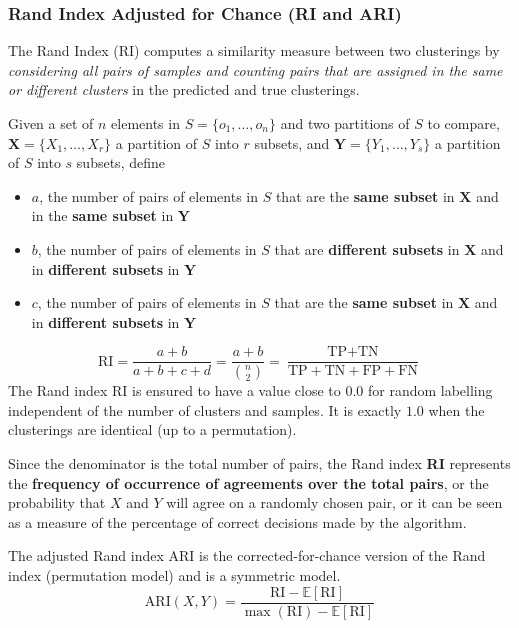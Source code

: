 \documentclass[11pt]{article}
\theoremstyle{definition}
\newcommand*\ev[1]{\mathrel{\mathbb{E}\left[#1\right]}}
\begin{document}
\subsubsection{Rand Index Adjusted for Chance (RI and ARI)}
The Rand Index (RI) computes a similarity measure between two clusterings by \emph{considering all pairs of samples and counting pairs that are assigned in the same or different clusters} in the predicted and true clusterings.

Given a set of $n$ elements in $S = \{o_1,\dots,o_n\}$ and two partitions of $S$ to compare, $\textbf{X} = \{X_1,\dots, X_r\}$ a partition of $S$ into $r$ subsets, and $\textbf{Y} = \{Y_1,\dots, Y_s\}$ a partition of $S$ into $s$ subsets, define
\begin{itemize}[nosep]
	\item $a$, the number of pairs of elements in $S$ that are the \textbf{same subset} in $\textbf{X}$ and in the \textbf{same subset} in $\textbf{Y}$
	\item $b$, the number of pairs of elements in $S$ that are \textbf{different subsets} in $\textbf{X}$ and in \textbf{different subsets} in $\textbf{Y}$
	\item $c$, the number of pairs of elements in $S$ that are the \textbf{same subset} in $\textbf{X}$ and in \textbf{different subsets} in $\textbf{Y}$
\end{itemize}
\begin{equation*}
	\text{RI} = \frac{a + b}{a + b + c + d} = \frac{a + b}{\binom{n}{2}} = \frac{\text{TP} + \text{TN}}{\text{TP} + \text{TN} + \text{FP} + \text{FN}}
\end{equation*}
The Rand index RI is ensured to have a value close to $0.0$ for random labelling independent of the number of clusters and samples. It is exactly $1.0$ when the clusterings are identical (up to a permutation).

Since the denominator is the total number of pairs, the Rand index \textbf{RI} represents the \textbf{frequency of occurrence of agreements over the total pairs}, or the probability that $X$ and $Y$ will agree on a randomly chosen pair, or it can be seen as a measure of the percentage of correct decisions made by the algorithm.

The adjusted Rand index ARI is the corrected-for-chance version of the Rand index (permutation model) and is a symmetric model.
\begin{equation*}
	\text{ARI}(X,Y) = \frac{\text{RI} - \ev{\text{RI}}}{\max(\text{RI}) - \ev{\text{RI}}}
\end{equation*}
\end{document}
